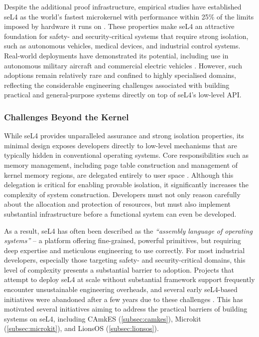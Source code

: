 Despite the additional proof infrastructure, empirical studies have established seL4 as the world’s fastest microkernel with performance within 25\% of the limits imposed by hardware it runs on \cite{mi2019skybridge}. These properties make seL4 an attractive foundation for safety- and security-critical systems that require strong isolation, such as autonomous vehicles, medical devices, and industrial control systems. Real-world deployments have demonstrated its potential, including use in autonomous military aircraft \citep{Cofer_GBWPFPKKAHS_18} and commercial electric vehicles \citep{Qu_24:sel4s}. However, such adoptions remain relatively rare and confined to highly specialised domains, reflecting the considerable engineering challenges associated with building practical and general-purpose systems directly on top of seL4’s low-level API.

\subsubsection{Challenges Beyond the Kernel}

While seL4 provides unparalleled assurance and strong isolation properties, its minimal design exposes developers directly to low-level mechanisms that are typically hidden in conventional operating systems. Core responsibilities such as memory management, including page table construction and management of kernel memory regions, are delegated entirely to user space \citep{elkaduwe2008sel4mem}. Although this delegation is critical for enabling provable isolation, it significantly increases the complexity of system construction. Developers must not only reason carefully about the allocation and protection of resources, but must also implement substantial infrastructure before a functional system can even be developed.

As a result, seL4 has often been described as the \emph{``assembly language of operating systems''} \citep{heiser2025lionsos} -- a platform offering fine-grained, powerful primitives, but requiring deep expertise and meticulous engineering to use correctly. For most industrial developers, especially those targeting safety- and security-critical domains, this level of complexity presents a substantial barrier to adoption. Projects that attempt to deploy seL4 at scale without substantial framework support frequently encounter unsustainable engineering overheads, and several early seL4-based initiatives were abandoned after a few years due to these challenges \citep{heiser2025lionsos}. This has motivated several initiatives aiming to address the practical barriers of building systems on seL4, including CAmkES \citep{KUZ2007687} (\autoref{subsec:camkes}), Microkit\citep{microkit:url} (\autoref{subsec:microkit}), and LionsOS \citep{heiser2025lionsos} (\autoref{subsec:lionsos}).

